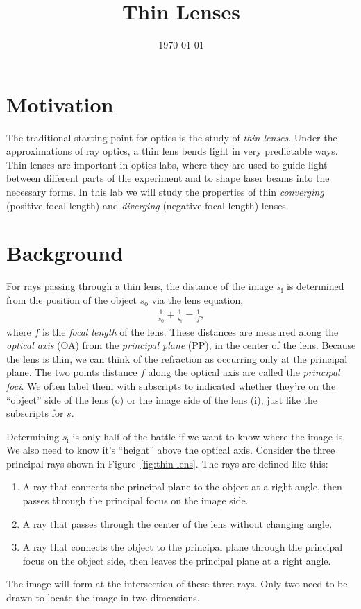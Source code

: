 \documentclass[]{manual}
\title{Thin Lenses}
\date{\today}
\begin{document}
    \maketitle
    \thispagestyle{firstpage}


    \section*{Motivation}
    
    The traditional starting point for optics is the study of \emph{thin lenses}.
    Under the approximations of ray optics, a thin lens bends light in very predictable ways.
    Thin lenses are important in optics labs, where they are used to guide light between different parts of the experiment and to shape laser beams into the necessary forms.
    In this lab we will study the properties of thin \emph{converging} (positive focal length) and \emph{diverging} (negative focal length) lenses.

    \section*{Background}
    
    For rays passing through a thin lens, the distance of the image $s_{\mathrm{i}}$ is determined from the position of the object $s_{\mathrm{o}}$ via the lens equation,
    \begin{align} \label{eqn:lens-equation}
        \frac{1}{s_0} + \frac{1}{s_{\mathrm{i}}} = \frac{1}{f},
    \end{align}
    where $f$ is the \emph{focal length} of the lens.
    These distances are measured along the \emph{optical axis} (OA) from the \emph{principal plane} (PP), in the center of the lens.
    Because the lens is thin, we can think of the refraction as occurring only at the principal plane.
    The two points distance $f$ along the optical axis are called the \emph{principal foci}.
    We often label them with subscripts to indicated whether they're on the ``object'' side of the lens (o) or the image side of the lens (i), just like the subscripts for $s$.
    
    Determining $s_{\mathrm{i}}$ is only half of the battle if we want to know where the image is.
    We also need to know it's ``height'' above the optical axis.
    Consider the three principal rays shown in Figure~\ref{fig:thin-lens}.
    The rays are defined like this:
    \begin{enumerate}
        \item A ray that connects the principal plane to the object at a right angle, then passes through the principal focus on the image side.
        \item A ray that passes through the center of the lens without changing angle.
        \item A ray that connects the object to the principal plane through the principal focus on the object side, then leaves the principal plane at a right angle.
    \end{enumerate}
    The image will form at the intersection of these three rays.
    Only two need to be drawn to locate the image in two dimensions.
    
\end{document}
